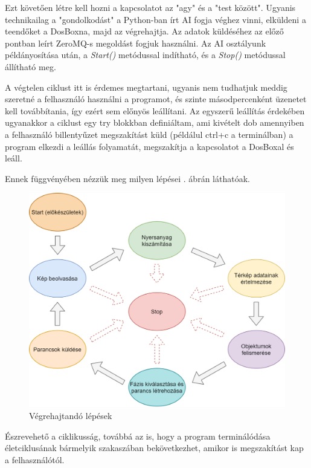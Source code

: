 
Ezt követően létre kell hozni a kapcsolatot az "agy" és a "test között". Ugyanis technikailag a "gondolkodást" a Python-ban írt AI fogja véghez vinni, elküldeni a teendőket a DosBoxna, majd az végrehajtja. Az adatok küldéséhez az előző pontban leírt
ZeroMQ-s megoldást fogjuk használni. Az AI osztályunk példányosítása után, a \textit{Start()} metódussal indítható, és a \textit{Stop()} metódussal állítható meg. 

A végtelen ciklust itt is érdemes megtartani, ugyanis nem tudhatjuk meddig szeretné a felhasználó használni a programot, és szinte másodpercenként üzenetet kell továbbítania, így ezért sem előnyös leállítani. Az egyszerű
leállítás érdekében ugyanakkor a ciklust egy try blokkban definiáltam, ami kivételt dob amennyiben a felhasználó billentyűzet megszakítást küld (példálul ctrl+c a terminálban) a program elkezdi a leállás folyamatát, megszakítja a kapcsolatot a DosBoxal és leáll.

Ennek függvényében nézzük meg milyen lépései . ábrán láthatóak.

\begin{figure}[h]
    \centering
    \includegraphics[scale=0.4]{images/image0.png}
    \caption{Végrehajtandó lépések}
    \label{fig:lepesek}
\end{figure}

Észrevehető a ciklikusság, továbbá az is, hogy a program terminálódása életciklusának bármelyik szakaszában bekövetkezhet, amikor is megszakítást kap a felhasználótól.

